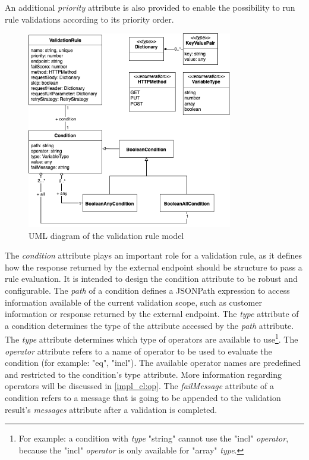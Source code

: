     An additional \emph{priority} attribute is also provided to enable the possibility to run rule validations according to its priority order.

    \begin{figure}[!ht]
      \includegraphics[width=0.8\textwidth]{diagrams/entity-validationrule.png}
      \caption{UML diagram of the validation rule model}
      \label{fig:uml_validation_rule}
    \end{figure}
    
    The \emph{condition} attribute plays an important role for a validation rule, as it defines how the response returned by the external endpoint should be structure to pass a rule evaluation. It is intended to design the condition attribute to be robust and configurable. The \emph{path} of a condition defines a JSONPath\autocite{Friesen2019} expression to access information available of the current validation scope, such as customer information or response returned by the external endpoint. The \emph{type} attribute of a condition determines the type of the attribute accessed by the \emph{path} attribute. The \emph{type} attribute determines which type of operators are available to use\footnote{For example: a condition with \emph{type} "string" cannot use the "incl" \emph{operator}, because the "incl" \emph{operator} is only available for "array" \emph{type}.}. The \emph{operator} attribute refers to a name of operator to be used to evaluate the condition (for example: "eq", "incl"). The available operator names are predefined and restricted to the condition's type attribute. More information regarding operators will be discussed in \autoref{impl_cl:op}. The \emph{failMessage} attribute of a condition refers to a message that is going to be appended to the validation result's \emph{messages} attribute after a validation is completed.

